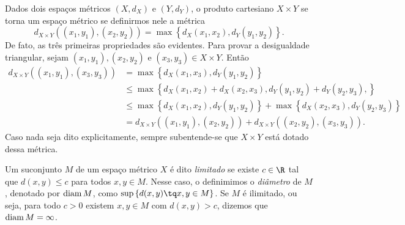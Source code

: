 \begin{exmp}
    Dados dois espaços métricos \( (X, d_{ X }) \) e \( (Y, d_{ Y }) \), o produto cartesiano \( X \times Y \) se torna um espaço métrico se definirmos nele a métrica \[
        d_{ X\times Y }((x_{ 1 }, y_{ 1 }), (x_{ 2 }, y_{ 2 })) = \max \left\{ d_{ X }(x_{ 1 }, x_{ 2 }), d_{ Y }(y_{ 1 }, y_{ 2 }) \right\}
    .\]
    De fato, as três primeiras propriedades são evidentes.
    Para provar a desigualdade triangular, sejam \( (x_{ 1 }, y_{ 1 }), (x_{ 2 }, y_{ 2 }) \) e \( (x_{ 3 }, y_{ 3 }) \in X \times Y \).
    Então
    \begin{align*}
        d_{ X\times Y } (
            (x_{ 1 }, y_{ 1 }),
            (x_{ 3 }, y_{ 3 })
        )
        &= \max \left\{ 
            d_{ X }(x_{ 1 }, x_{ 3 }),
            d_{ Y }(y_{ 1 }, y_{ 2 })
        \right\} \\
        &\leq \max \left\{ 
            d_{ X }(x_{ 1 }, x_{ 2 }) + 
            d_{ X }(x_{ 2 }, x_{ 3 }),
            d_{ Y }(y_{ 1 }, y_{ 2 }) + 
            d_{ Y }(y_{ 2 }, y_{ 3 }),
        \right\} \\
        &\leq \max \left\{
            d_{ X }(x_{ 1 }, x_{ 2 }),
            d_{ Y }(y_{ 1 }, y_{ 2 })
        \right\} +
        \max \left\{ 
            d_{ X }(x_{ 2 }, x_{ 3 }),
            d_{ Y }(y_{ 2 }, y_{ 3 })
        \right\} \\
        &= d_{ X\times Y }(
            (x_{ 1 }, y_{ 1 }),
            (x_{ 2 }, y_{ 2 })
        ) +
        d_{ X\times Y }(
            (x_{ 2 }, y_{ 2 }),
            (x_{ 3 }, y_{ 3 })
        )
    .\end{align*}
    Caso nada seja dito explicitamente, sempre subentende-se que \( X \times Y \) está dotado dessa métrica.
\end{exmp}

\begin{defn}
    Um suconjunto \( M \) de um espaço métrico \( X \) é dito \emph{limitado} se existe \( c \in \R \) tal que \( d(x, y) \leq c \) para todos \( x, y \in M \).
    Nesse caso, o definimimos o \emph{diâmetro} de \( M \), denotado por \( \operatorname{diam} M \), como \( \sup \left\{ d(x, y) \tq x, y \in M \right\} \).
    Se \( M \) é ilimitado, ou seja, para todo \( c > 0 \) existem \( x, y \in M \) com \( d(x, y) > c \), dizemos que \( \operatorname{diam} M = \infty \).
\end{defn}



